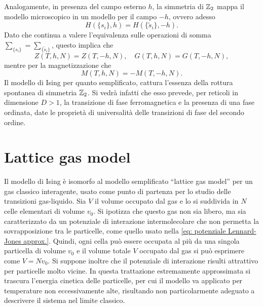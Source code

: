 Analogamente, in presenza del campo esterno $h$, la simmetria di $\mathbb{Z}_2$ mappa il modello microscopico in un modello per il campo $-h$, ovvero adesso
\begin{equation}
    H(\{s_i\},h) =  H(\{\tilde{s}_i\},-h).
\end{equation}
Dato che continua a valere l'equivalenza sulle operazioni di somma $\sum_{\{s_i\}} = \sum_{\{\tilde{s}_i\}}$, questo implica che
\begin{equation}
    Z(T,h,N) = Z(T,-h,N),\quad G(T,h,N) = G(T,-h,N),
\end{equation}
mentre per la magnetizzazione che
\begin{equation}
    M(T,h,N) = - M(T,-h,N).
\end{equation}
Il modello di Ising per quanto semplificato, cattura l'essenza della rottura spontanea di simmetria $\mathbb{Z}_2$. Si vedrà infatti che esso prevede, per reticoli in dimensione $D > 1$, la transizione di fase ferromagnetica e la presenza di una fase ordinata, date le proprietà di universalità delle transizioni di fase del secondo ordine.

\section{Lattice gas model}
Il modello di Ising è isomorfo al modello semplificato ``lattice gas model'' per un gas classico interagente, usato come punto di partenza per lo studio delle transizioni gas-liquido. Sia $V$ il volume occupato dal gas e lo si suddivida in $N$ celle elementari di volume $v_0$. Si ipotizza che questo gas non sia libero, ma sia caratterizzato da un potenziale di interazione intermolecolare che non permetta la sovrapposizione tra le particelle, come quello usato nella \eqref{eq: potenziale Lennard-Jones approx.}. Quindi, ogni cella può essere occupata al più da una singola particella di volume $v_0$ e il volume totale $V$ occupato dal gas si può esprimere come $V = Nv_0$. Si suppone inoltre che il potenziale di interazione risulti attrattivo per particelle molto vicine. In questa trattazione estremamente approssimata si trascura l'energia cinetica delle particelle, per cui il modello va applicato per temperature non eccessivamente alte, risultando non particolarmente adeguato a descrivere il sistema nel limite classico. 

